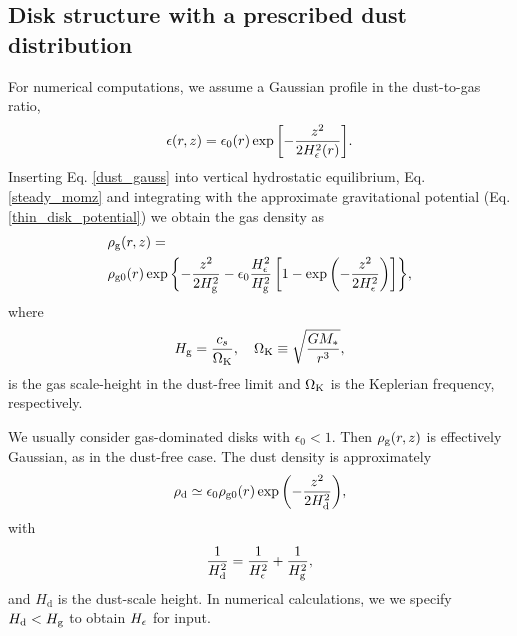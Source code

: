 \subsection{Disk structure with a prescribed dust distribution}\label{steady_state}  
For numerical computations, we assume a Gaussian profile in the
dust-to-gas ratio,    
\begin{align}\label{dust_gauss}
  \epsilon(r,z) = \epsilon_0(r)
  \exp{\left[-\frac{z^2}{2H_\epsilon^2(r)}\right]}. 
\end{align}
Inserting Eq. \ref{dust_gauss} into vertical hydrostatic equilibrium,
Eq. \ref{steady_momz} and integrating with the approximate
gravitational potential (Eq. \ref{thin_disk_potential}) we obtain the
gas density as
\begin{align}
  &\rho_\mathrm{g}(r,z)= \notag\\
&\rho_\mathrm{g0}(r)\exp{\left\{ - \frac{z^2}{2H_\mathrm{g}^2}
    -\epsilon_0\frac{H_\epsilon^2}{H_\mathrm{g}^2}\left[1 -
      \exp{\left(-\frac{z^2}{2H_\epsilon^2}\right)}\right] \right\}}, 
\end{align}
where
\begin{align}
  H_\mathrm{g} = \frac{c_s}{\Omega_{\rm K}}, \quad \Omega_{\rm K} \equiv \sqrt{\frac{GM_*}{r^3}},   
\end{align}
is the gas scale-height in the dust-free limit and $\Omega_{\rm K}$ is the
Keplerian frequency, respectively. 

We usually consider gas-dominated disks with $\epsilon_0 < 1$.  
Then $\rho_\mathrm{g}(r,z)$ is effectively Gaussian, as in the 
dust-free case. The dust density is approximately 
\begin{align}
  \rho_\mathrm{d} \simeq \epsilon_0\rho_\mathrm{g0}(r) \exp
        {\left(-\frac{z^2}{2H_\mathrm{d}^2}\right)}, 
\end{align}
with 
\begin{align}
  \frac{1}{H_\mathrm{d}^2} = \frac{1}{H_\epsilon^2} + \frac{1}{H_\mathrm{g}^2}, 
\end{align}
and $H_\mathrm{d}$ is the dust-scale height. In numerical
calculations, we  we specify $H_\mathrm{d}< H_\mathrm{g}$ to obtain 
$H_\epsilon$ for input. 

